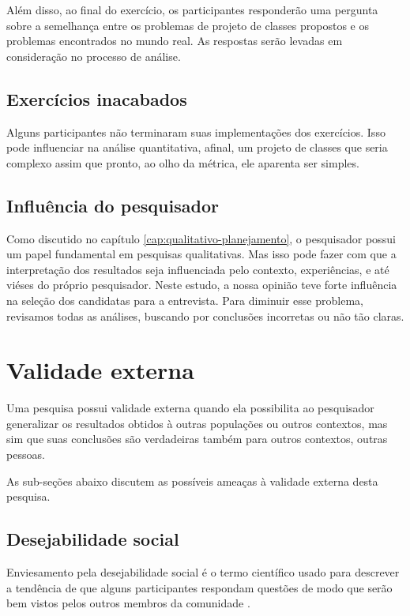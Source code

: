 Além disso, ao final do exercício, os participantes responderão uma pergunta sobre a semelhança
entre os problemas de projeto de classes propostos e os problemas encontrados no mundo real.
As respostas serão levadas em consideração no processo de análise.

\subsection{Exercícios inacabados}

Alguns participantes não terminaram suas implementações dos exercícios. Isso
pode influenciar na análise quantitativa, afinal, um projeto de classes que
seria complexo assim que pronto, ao olho da métrica, ele aparenta ser simples.

\subsection{Influência do pesquisador}

Como discutido no capítulo \ref{cap:qualitativo-planejamento}, o pesquisador possui
um papel fundamental em pesquisas qualitativas. Mas isso pode fazer com que
a interpretação dos resultados seja influenciada pelo contexto, experiências,
e até viéses do próprio pesquisador.
Neste estudo, a nossa opinião teve forte influência na seleção dos candidatas
para a entrevista.
Para diminuir esse problema, revisamos todas as análises,
buscando por conclusões incorretas ou não tão claras. 

\section{Validade externa}

Uma pesquisa possui validade externa quando ela possibilita ao pesquisador 
generalizar os resultados obtidos à outras populações ou outros contextos, 
mas sim que suas conclusões são verdadeiras também para outros contextos, outras pessoas. 

As sub-seções abaixo discutem as possíveis ameaças à validade externa
desta pesquisa.

\subsection{Desejabilidade social}

Enviesamento pela desejabilidade social é o termo científico usado para descrever
a tendência de que alguns participantes respondam questões de modo que serão
bem vistos pelos outros membros da comunidade \cite{crowne}.

